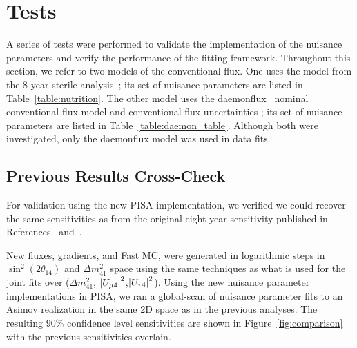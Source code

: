 \documentclass[main.tex]{subfiles}
\begin{document}
\section{Tests}

A series of tests were performed to validate the implementation of the nuisance parameters and verify the performance of the fitting framework. 
Throughout this section, we refer to two models of the conventional flux.
One uses the model from the 8-year sterile analysis~\cite{Aartsen_2020, Aartsen_2020_prd}; its set of nuisance parameters are listed in Table~\ref{table:nutrition}.
The other model uses the daemonflux~\cite{yanez2023daemonflux} nominal conventional flux model and conventional flux uncertainties ; its set of nuisance parameters are listed in Table~\ref{table:daemon_table}. 
Although both were investigated, only the daemonflux model was used in data fits. 

\subsection{Previous Results Cross-Check}

For validation using the new PISA implementation, we verified we could recover the same sensitivities as from the original eight-year sensitivity published in References~\cite{Aartsen_2020} and~\cite{Aartsen_2020_prd}.

New fluxes, gradients, and Fast MC, were generated in logarithmic steps in $\sin^{2}(2\theta_{14})$ and $\Delta m_{41}^{2}$ space using the same techniques as what is used for the joint fits over ($\Delta m_{41}^{2}$, $\left| U_{\mu 4} \right|^{2}$,$\left| U_{\tau 4} \right|^{2}$).
Using the new nuisance parameter implementations in PISA, we ran a global-scan of nuisance parameter fits to an Asimov realization in the same 2D space as in the previous analyses. 
The resulting 90\% confidence level sensitivities are shown in Figure~\ref{fig:comparison} with the previous sensitivities overlain. 
\end{document}
